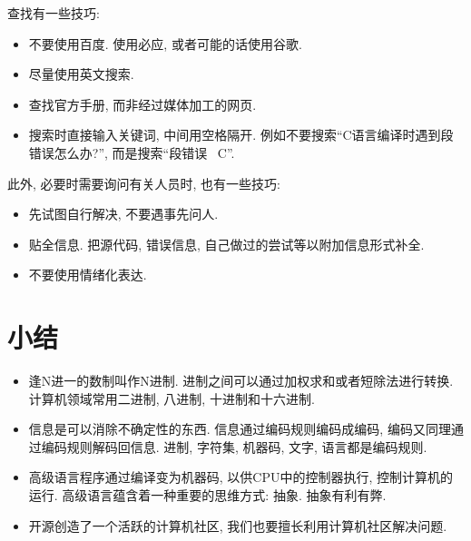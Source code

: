        查找有一些技巧:
        \vspace*{-13pt}
        \begin{itemize}
            \item 不要使用百度. 使用必应, 或者可能的话使用谷歌.
            \item 尽量使用英文搜索.
            \item 查找官方手册, 而非经过媒体加工的网页.
            \item 搜索时直接输入关键词, 中间用空格隔开. 例如不要搜索``C语言编译时遇到段错误怎么办?'', 而是搜索``段错误 \ C''.
        \end{itemize}

        此外, 必要时需要询问有关人员时, 也有一些技巧:
        \vspace*{-13pt}
        \begin{itemize}
            \item 先试图自行解决, 不要遇事先问人.
            \item 贴全信息. 把源代码, 错误信息, 自己做过的尝试等以附加信息形式补全.
            \item 不要使用情绪化表达. 
        \end{itemize}

    \sumrule
    \section*{小结}
        \begin{itemize}
            \item 逢N进一的数制叫作N进制. 进制之间可以通过加权求和或者短除法进行转换. 计算机领域常用二进制, 八进制, 十进制和十六进制.
            \item 信息是可以消除不确定性的东西. 信息通过编码规则编码成编码, 编码又同理通过编码规则解码回信息. 进制, 字符集, 机器码, 文字, 语言都是编码规则.
            \item 高级语言程序通过编译变为机器码, 以供CPU中的控制器执行, 控制计算机的运行. 高级语言蕴含着一种重要的思维方式: 抽象. 抽象有利有弊.
            \item 开源创造了一个活跃的计算机社区, 我们也要擅长利用计算机社区解决问题.
        \end{itemize}